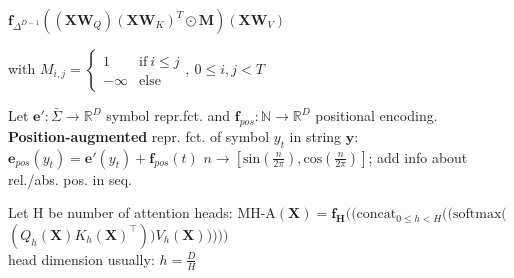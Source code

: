  $\textbf{f}_{\Delta^{D-1}}((\mathbf{X}\mathbf{W}_Q)(\mathbf{X}\mathbf{W}_K)^T \odot \mathbf{M})(\mathbf{X}\mathbf{W}_V)$

with \(M_{i, j} = 
\begin{cases}
    1 & \text{if} \ i\leq j\\
    -\infty & \text{else}
\end{cases}, \ 0\leq i,j < T\)

 Let \(\mathbf{e}':\bar{\Sigma}\to\mathbb{R}^D\) symbol repr.fct. and \(\mathbf{f}_{pos}:\mathbb{N}\to\mathbb{R}^D\) positional encoding. \\
\textbf{Position-augmented} repr. fct. of symbol \(y_t\) in string \(\textbf{y}\):\\
$\mathbf{e}_{pos}(y_t)=\mathbf{e}'(y_t)+\mathbf{f}_{pos}(t)$
\example \(n\to [\text{sin}(\frac{n}{2\pi}), \text{cos}(\frac{n}{2\pi})]\); add info about rel./abs. pos. in seq.

 Let H be number of attention heads: 
$\text{MH-A}(\mathbf{X}) = \mathbf{f_H}((\text{concat}_{0 \le h < H}((\text{softmax}($\\
$(Q_h(\mathbf{X})K_h(\mathbf{X})^\top))V_h(\mathbf{X})))))$ \\
head dimension usually: \(h = \frac{D}{H}\)

